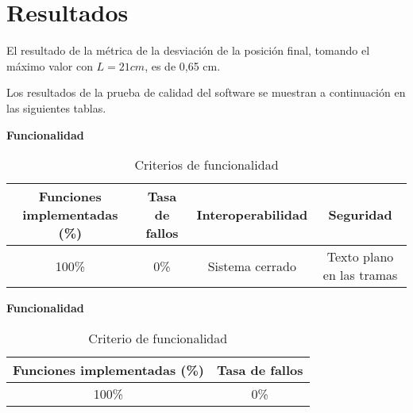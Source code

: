 \section{Resultados}

El resultado de la métrica de la desviación de la posición final, tomando el máximo valor con $L = 21 cm$, es de 0,65 cm.

Los resultados de la prueba de calidad del software se muestran a continuación en las siguientes tablas.

\textbf{Funcionalidad}

\begin{table}[ht]
	\centering
	\begin{tabular}{|c|c|c|c|}
		\hline
		\textbf{Funciones implementadas (\%)} & \textbf{Tasa de fallos} & \textbf{Interoperabilidad} & \textbf{Seguridad} \\
		\hline
		100\% & 0\% & Sistema cerrado & Texto plano en las tramas \\
		\hline
	\end{tabular}
	\caption{Criterios de funcionalidad}
	\label{tab:Resultados}
\end{table}

\textbf{Funcionalidad}

\begin{table}[ht]
	\centering
	\begin{tabular}{|c|c|}
		\hline
		\textbf{Funciones implementadas (\%)} & \textbf{Tasa de fallos} \\
		\hline
		100\% & 0\% \\
		\hline
	\end{tabular}
	\caption{Criterio de funcionalidad}
	\label{tab:Resultados}
\end{table}